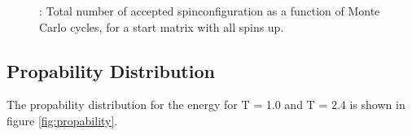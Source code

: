 \documentclass{article}
\begin{document}
{{\begin{figure}[H]
\caption{: Total number of accepted spinconfiguration as a function of Monte Carlo cycles, for a start matrix with all spins up. }
\label{fig:flips_random}
\end{figure}


\subsection{Propability Distribution}
The propability distribution for the energy for T = 1.0 and T = 2.4 is shown in figure \ref{fig:propability}.

}}
\end{document}
